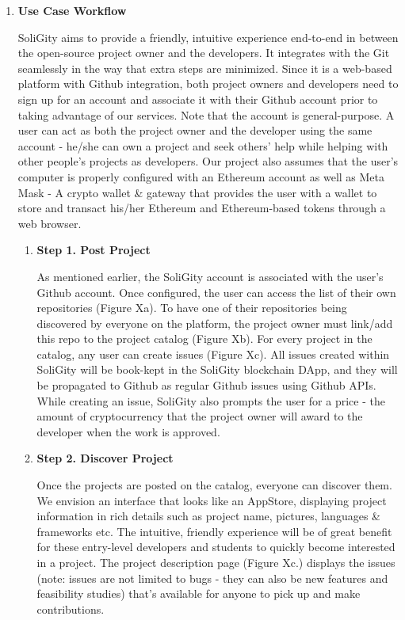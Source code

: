 \documentclass[12pt]{article}
\renewcommand{\_}{\kern-1.5pt\textunderscore\kern-1.5pt}
\begin{document}
\begin{enumerate}
	\item \textbf{Use Case Workflow} \par
    SoliGity aims to provide a friendly, intuitive experience end-to-end in between the open-source project owner and the developers. It integrates with the Git seamlessly in the way that extra steps are minimized. Since it is a web-based platform with Github integration, both project owners and developers need to sign up for an account and associate it with their Github account prior to taking advantage of our services. Note that the account is general-purpose. A user can act as both the project owner and the developer using the same account - he/she can own a project and seek others’ help while helping with other people’s projects as developers. Our project also assumes that the user’s computer is properly configured with an Ethereum account as well as Meta Mask - A crypto wallet & gateway that provides the user with a wallet to store and transact his/her Ethereum and Ethereum-based tokens through a web browser. 
	      \begin{enumerate}
	      
		      \item \textbf{Step 1. Post Project}\par

                As mentioned earlier, the SoliGity account is associated with the user’s Github account. Once configured, the user can access the list of their own repositories (Figure Xa). To have one of their repositories being discovered by everyone on the platform, the project owner must link/add this repo to the project catalog (Figure Xb). For every project in the catalog, any user can create issues (Figure Xc). All issues created within SoliGity will be book-kept in the SoliGity blockchain DApp, and they will be propagated to Github as regular Github issues using Github APIs. While creating an issue, SoliGity also prompts the user for a price - the amount of cryptocurrency that the project owner will award to the developer when the work is approved. \par
                
		      \item \textbf{Step 2. Discover Project}\par
		      Once the projects are posted on the catalog, everyone can discover them. We envision an interface that looks like an AppStore, displaying project information in rich details such as project name, pictures, languages & frameworks etc. The intuitive, friendly experience will be of great benefit for these entry-level developers and students to quickly become interested in a project. The project description page (Figure Xc.) displays the issues (note: issues are not limited to bugs - they can also be new features and feasibility studies) that’s available for anyone to pick up and make contributions. 


\end{enumerate}
\end{enumerate}
\end{document}
